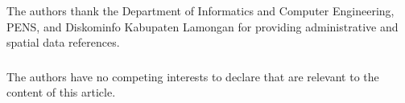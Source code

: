 \documentclass[runningheads]{llncs}
\begin{document}
\begin{credits}\vspace{-8pt}
\subsubsection*{\ackname}\vspace{-4pt}
\noindent\small The authors thank the Department of Informatics and Computer Engineering, PENS, and Diskominfo Kabupaten Lamongan for providing administrative and spatial data references.

\vspace{-6pt}
\subsubsection*{\discintname}\vspace{-4pt}
\noindent\small The authors have no competing interests to declare that are relevant to the content of this article.
\end{credits}

%
%
\renewcommand{\doi}[1]{\href{https://doi.org/#1}{\nolinkurl{doi:#1}}}
\makeatletter
\renewenvironment{thebibliography}[1]
     {\section*{\refname}%
      \enlargethispage{7\baselineskip}%
      \def\@biblabel##1{##1.}%
      \fontsize{6.6pt}{7.6pt}\selectfont
      \raggedbottom
      \list{\@biblabel{\@arabic\c@enumiv}}%
           {\settowidth\labelwidth{\@biblabel{#1}}%
            \leftmargin\labelwidth
            \advance\leftmargin\labelsep
            \setlength{\itemsep}{-1.2pt}%
            \setlength{\parsep}{0pt}%
            \usecounter{enumiv}%
            \let\p@enumiv\@empty
            \renewcommand\theenumiv{\@arabic\c@enumiv}}%
      \sloppy\clubpenalty4000\widowpenalty4000
      \sfcode`\.=\@m}
     {\def\@noitemerr
       {\@latex@warning{Empty `thebibliography' environment}}%
      \endlist}
\makeatother


\end{document}

